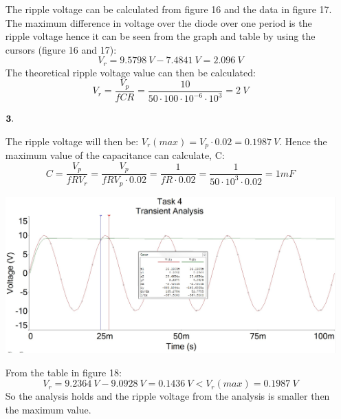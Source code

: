 \documentclass[11pt,a4paper]{article}
\begin{document}
\begin{enumerate}
	The ripple voltage can be calculated from figure 16 and the data in figure 17. The maximum difference in voltage over the diode over one period is the ripple voltage hence it can be seen from the graph and table by using the cursors (figure 16 and 17): $$ V_r = 9.5798\ V - 7.4841 \ V = 2.096 \ V$$
    The theoretical ripple voltage value can then be calculated: $$ V_r = \dfrac{V_p}{fCR} = \dfrac{10}{50 \cdot 100 \cdot 10^{-6} \cdot 10^3} = 2\ V$$
  
  \item[$\bold{3.}$]
  
  	The ripple voltage will then be: $V_r(max) = V_p \cdot 0.02 = 0.1987\ V$. Hence the maximum value of the capacitance can calculate, C: $$ C = \dfrac{V_p}{f R V_r} = \dfrac{V_p}{f R V_p \cdot 0.02} = \dfrac{1}{f R \cdot 0.02} = \dfrac{1}{50 \cdot 10^3 \cdot 0.02} = 1mF $$
  	
  	\begin{minipage}{\linewidth}
    	\centering
        \includegraphics[width=15cm]{4_4.jpg}
    \end{minipage}
    \vspace{1em}
    
   From the table in figure 18: $$ V_r = 9.2364 \: V- 9.0928\: V = 0.1436\: V < V_r(max) = 0.1987\: V$$ 
    So the analysis holds and the ripple voltage from the analysis is smaller then the maximum value.
  
\end{enumerate}

  
\end{document}
